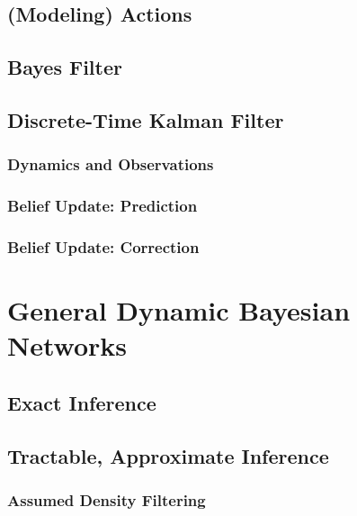 		\subsection{(Modeling) Actions} %

		\subsection{Bayes Filter} %

		\subsection{Discrete-Time Kalman Filter} %

			\subsubsection{Dynamics and Observations} %

			\subsubsection{Belief Update: Prediction} %

			\subsubsection{Belief Update: Correction} %

	\section{General Dynamic Bayesian Networks} %

		\subsection{Exact Inference} %

		\subsection{Tractable, Approximate Inference} %

			\subsubsection{Assumed Density Filtering} %

